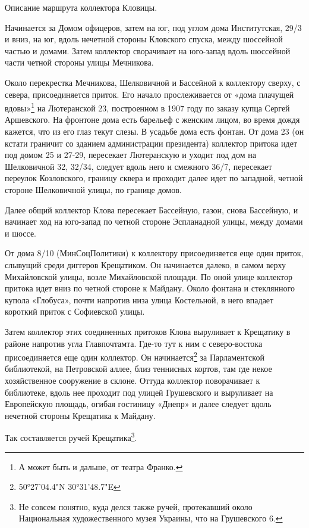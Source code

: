 Описание маршрута коллектора Кловицы.

Начинается за Домом офицеров, затем на юг, под углом дома Институтская, 29/3 и вниз, на юг, вдоль нечетной стороны Кловского спуска, между шоссейной частью и домами. Затем коллектор сворачивает на юго-запад вдоль шоссейной части четной стороны улицы Мечникова.

Около перекрестка Мечникова, Шелковичной и Бассейной к коллектору сверху, с севера, присоединяется приток. Его начало прослеживается от «дома плачущей вдовы»\footnote{А может быть и дальше, от театра Франко.} на Лютеранской 23, построенном в 1907 году по заказу купца Сергей Аршевского. На фронтоне дома есть барельеф с женским лицом, во время дождя кажется, что из его глаз текут слезы. В усадьбе дома есть фонтан.
От дома 23 (он кстати граничит со зданием администрации президента) коллектор притока идет под домом 25 и 27-29, пересекает Лютеранскую и уходит под дом на Шелковичной 32, 32/34, следует вдоль него и смежного 36/7, пересекает переулок Козловского, границу сквера и проходит далее идет по западной, четной стороне Шелковичной улицы, по границе домов.

Далее общий коллектор Клова пересекает Бассейную, газон, снова Бассейную, и начинает ход на юго-запад по четной стороне Эспланадной улицы, между домами и шоссе.

От дома 8/10 (МинСоцПолитики) к коллектору присоединяется еще один приток, слывущий среди диггеров Крещатиком. Он начинается далеко, в самом верху Михайловской улицы, возле Михайловской площади. По оной улице коллектор притока идет вниз по четной стороне к Майдану. Около фонтана и стеклянного купола «Глобуса», почти напротив низа улица Костельной, в него впадает короткий приток с Софиевской улицы.

Затем коллектор этих соединенных притоков Клова выруливает к Крещатику в районе напротив угла Главпочтамта. Где-то тут к ним с северо-востока присоединяется еще один коллектор. Он начинается\footnote{50°27'04.4"N 30°31'48.7"E} за Парламентской библиотекой, на Петровской аллее, близ теннисных кортов, там где некое хозяйственное сооружение в склоне. Оттуда коллектор поворачивает к библиотеке, вдоль нее проходит под улицей Грушевского и выруливает на Европейскую площадь, огибая гостиницу «Днепр» и далее следует вдоль нечетной стороны Крещатика к Майдану. 

Так составляется ручей Крещатика\footnote{Не совсем понятно, куда делся также ручей, протекавший около Национальная художественного музея Украины, что на Грушевского 6.}. 

